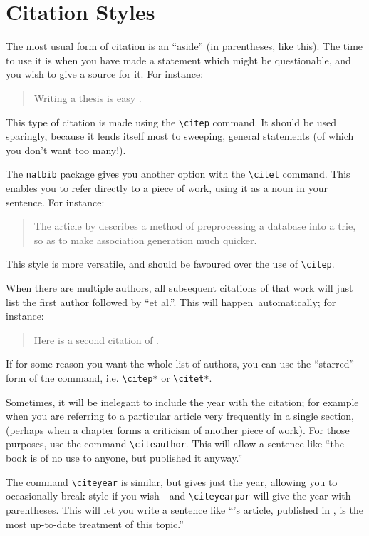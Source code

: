 \section{Citation Styles}

The most usual form of citation is an ``aside'' (in parentheses, like
this). The time to use it is when you have made a statement which
might be questionable, and you wish to give a source for it. For
instance:
\begin{quote}
Writing a thesis is easy \citep{rountree98}.
\end{quote}
This type of citation is made using the \verb|\citep| command.  It
should be used sparingly, because it lends itself most to sweeping,
general statements (of which you don't want too many!).

The {\tt natbib} package gives you another option with
the \verb|\citet| command.  This enables you to refer directly
to a piece of work, using it as a noun in your sentence.  For
instance:
\begin{quote}
The article by \citet{amir97} describes a method of preprocessing
a database into a trie, so as to make association generation much quicker.
\end{quote}
This style is more versatile, and should be favoured over the use of
\verb|\citep|.

When there are multiple authors, all subsequent citations of that work
will just list the first author followed by ``et al.''.  This will happen\
automatically; for instance:
\begin{quote}
Here is a second citation of \citet{amir97}.
\end{quote}
If for some reason you want the whole list of authors, you can use the
``starred'' form of the command, i.e. \verb|\citep*| or
\verb|\citet*|. 

Sometimes, it will be inelegant to include the year with the
citation; for example when you are referring to a particular article
very frequently in a single section, (perhaps when a chapter forms a
criticism of another piece of work).  For those purposes, use the command
\verb|\citeauthor|.  This will allow a sentence like ``the
book is of no use to anyone, but \citeauthor{rountree98} published it
anyway.''

The command \verb|\citeyear| is similar, but gives just the year,
allowing you to occasionally break style if you wish---and
\verb|\citeyearpar| will give the year with parentheses.  This will
let you write a sentence like ``\citeauthor{amir97}'s article, published
in \citeyear{amir97}, is the most up-to-date treatment of this topic.''

